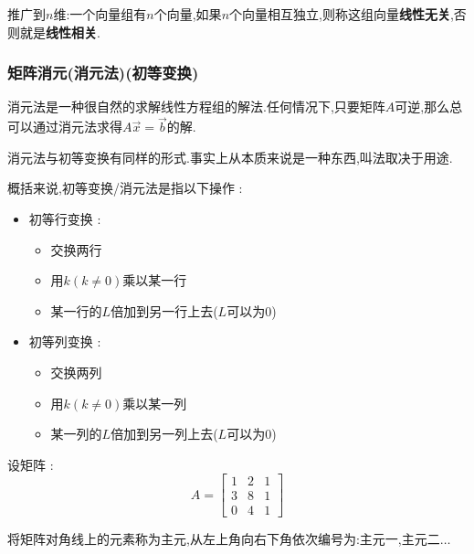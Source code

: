 \documentclass[UTF8,12pt]{ctexbook}
\newcommand{\boldText}[1]{{\bfseries#1}}
\begin{document}
{{{{{  推广到$n$维:一个向量组有$n$个向量,如果$n$个向量相互独立,则称这组向量\boldText{线性无关},否则就是\boldText{线性相关}.
}%

\subsubsection{矩阵消元(消元法)(初等变换)}{
  消元法是一种很自然的求解线性方程组的解法.任何情况下,只要矩阵$A$可逆,那么总可以通过消元法求得$A\vec{x} = \vec{b}$的解.

  消元法与初等变换有同样的形式.事实上从本质来说是一种东西,叫法取决于用途.

  概括来说,初等变换/消元法是指以下操作 :

  \begin{itemize}
    \item {
          初等行变换 :
          \begin{itemize}
            \item 交换两行
            \item 用$k(k \neq 0)$乘以某一行
            \item 某一行的$L$倍加到另一行上去($L$可以为0)
          \end{itemize}
          }
    \item {
          初等列变换 :
          \begin{itemize}
            \item 交换两列
            \item 用$k(k \neq 0)$乘以某一列
            \item 某一列的$L$倍加到另一列上去($L$可以为0)
          \end{itemize}
          }
  \end{itemize}

  设矩阵 :
  $$
    A = \begin{bmatrix}
      1 & 2 & 1 \\
      3 & 8 & 1 \\
      0 & 4 & 1
    \end{bmatrix}
  $$

  将矩阵对角线上的元素称为主元,从左上角向右下角依次编号为:主元一,主元二$\dots$

}}}}}
\end{document}
